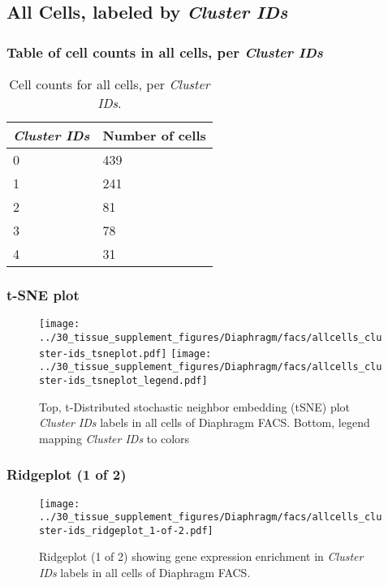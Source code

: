 \clearpage

\subsection{All Cells, labeled by \emph{Cluster IDs}}
\subsubsection{Table of cell counts in all cells, per \emph{Cluster IDs}}\begin{table}[h]
\centering
\label{my-label}
\begin{tabular}{@{}ll@{}}
\toprule

\emph{Cluster IDs}& Number of cells \\ \midrule
0 & 439 \\

1 & 241 \\

2 & 81 \\

3 & 78 \\

4 & 31 \\
\bottomrule
\end{tabular}
\caption{Cell counts for all cells, per \emph{Cluster IDs}.}
\end{table}

\clearpage
\subsubsection{t-SNE plot}
\begin{figure}[h]
\centering
\texttt{[image: ../30\_tissue\_supplement\_figures/Diaphragm/facs/allcells\_cluster-ids\_tsneplot.pdf]}
\texttt{[image: ../30\_tissue\_supplement\_figures/Diaphragm/facs/allcells\_cluster-ids\_tsneplot\_legend.pdf]}
\caption{Top, t-Distributed stochastic neighbor embedding (tSNE) plot  \emph{Cluster IDs} labels in all cells of Diaphragm FACS. Bottom, legend mapping \emph{Cluster IDs} to colors}
\end{figure}


\clearpage

\subsubsection{Ridgeplot (1 of 2)}
\begin{figure}[h]
\centering
\texttt{[image: ../30\_tissue\_supplement\_figures/Diaphragm/facs/allcells\_cluster-ids\_ridgeplot\_1-of-2.pdf]}

\caption{ Ridgeplot (1 of 2)  showing gene expression enrichment in \emph{Cluster IDs} labels in all cells of Diaphragm FACS. }
\end{figure}


